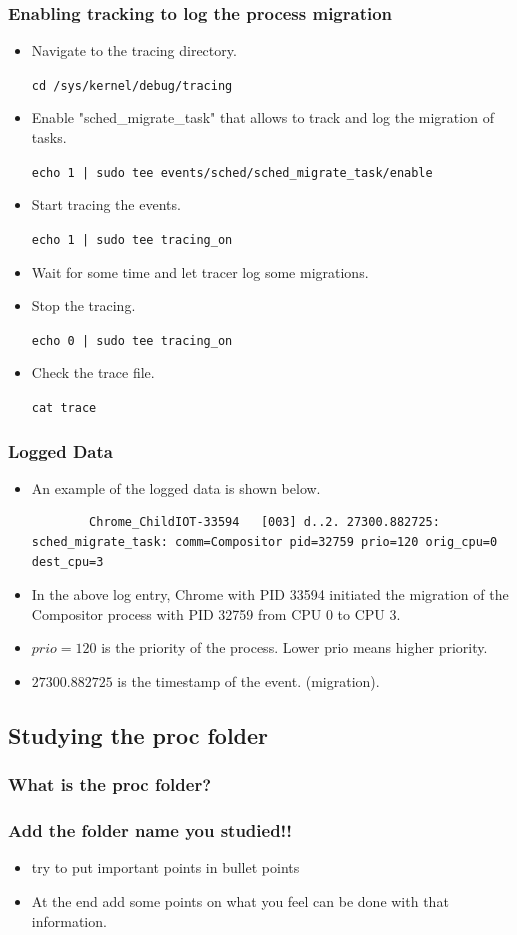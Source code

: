 \documentclass[12pt]{article}
\begin{document}
\subsubsection{Enabling tracking to log the process migration}
\begin{itemize}
    \item Navigate to the tracing directory. 
    
    \texttt{cd /sys/kernel/debug/tracing}
    \item Enable "sched\_migrate\_task" that allows to track and log the migration of tasks.

    \texttt{echo 1 | sudo tee events/sched/sched_migrate_task/enable}
    \item Start tracing the events. 
    
    \texttt{echo 1 | sudo tee tracing_on}
    \item Wait for some time and let tracer log some migrations.
    \item Stop the tracing. 
    
    \texttt{echo 0 | sudo tee tracing_on}
    \item Check the trace file. 
    
    \texttt{cat trace}
\end{itemize}
\subsubsection{Logged Data}
\begin{itemize}
    \item An example of the logged data is shown below.
    \begin{verbatim} 
        Chrome_ChildIOT-33594   [003] d..2. 27300.882725: sched_migrate_task: comm=Compositor pid=32759 prio=120 orig_cpu=0 dest_cpu=3
    \end{verbatim}
    \item In the above log entry, Chrome with PID 33594 initiated the migration of the Compositor process with PID 32759 from CPU 0 to CPU 3.
    \item $prio =120$ is the priority of the process. Lower prio means higher priority.
    \item $27300.882725$ is the timestamp of the event. (migration).
\end{itemize}
\subsection{Studying the proc folder}
\subsubsection{What is the proc folder?}
\subsubsection{Add the folder name you studied!!}
\begin{itemize}
    \item try to put important points in bullet points
    \item At the end add some points on what you feel can be done with that information.
\end{itemize}
\end{document}
